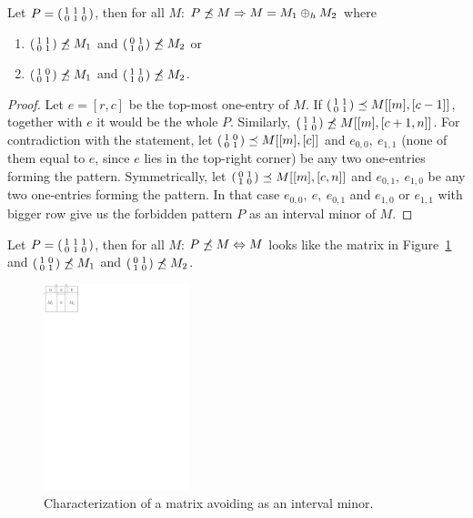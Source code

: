 \begin{lemma}
\label{lemma2}
Let $P=\left(\begin{smallmatrix}1&1&1\\0&1&0\end{smallmatrix}\right)$, then for all $M$: $P\not\preceq M\Rightarrow M=M_1\oplus_hM_2$ where
\begin{enumerate}
\item $\left(\begin{smallmatrix}1&1\\0&1\end{smallmatrix}\right)\not\preceq M_1$ and $\left(\begin{smallmatrix}0&1\\1&0\end{smallmatrix}\right)\not\preceq M_2$ or
\item $\left(\begin{smallmatrix}1&0\\0&1\end{smallmatrix}\right)\not\preceq M_1$ and $\left(\begin{smallmatrix}1&1\\1&0\end{smallmatrix}\right)\not\preceq M_2$.
\end{enumerate}
\end{lemma}
\begin{proof}
Let $e=[r,c]$ be the top-most one-entry of $M$. If $\left(\begin{smallmatrix}1&1\\0&1\end{smallmatrix}\right)\preceq M[[m],[c-1]]$, together with $e$ it would be the whole $P$. Similarly, $\left(\begin{smallmatrix}1&1\\1&0\end{smallmatrix}\right)\not\preceq M[[m],[c+1,n]]$. For contradiction with the statement, let $\left(\begin{smallmatrix}1&0\\0&1\end{smallmatrix}\right)\preceq M[[m],[c]]$ and $e_{0,0},\ e_{1,1}$ (none of them equal to $e$, since $e$ lies in the top-right corner) be any two one-entries forming the pattern. Symmetrically, let $\left(\begin{smallmatrix}0&1\\1&0\end{smallmatrix}\right)\preceq M[[m],[c,n]]$ and $e_{0,1},\ e_{1,0}$ be any two one-entries forming the pattern. In that case $e_{0,0},\ e,\ e_{0,1}$ and $e_{1,0}$ or $e_{1,1}$ with bigger row give us the forbidden pattern $P$ as an interval minor of $M$.
\end{proof}
\begin{thm}
Let $P=\left(\begin{smallmatrix}1&1&1\\0&1&0\end{smallmatrix}\right)$, then for all $M$: $P\not\preceq M\Leftrightarrow M$ looks like the matrix in Figure~\ref{p72} and $\left(\begin{smallmatrix}1&0\\0&1\end{smallmatrix}\right)\not\preceq M_1$ and $\left(\begin{smallmatrix}0&1\\1&0\end{smallmatrix}\right)\not\preceq M_2$.
\end{thm}
\begin{figure}[h!]
\centering
\includegraphics[height=60mm]{img/p72.pdf}
\caption{Characterization of a matrix avoiding \usebox{\smlmatb} as an interval minor.}
\label{p72}
\end{figure}
